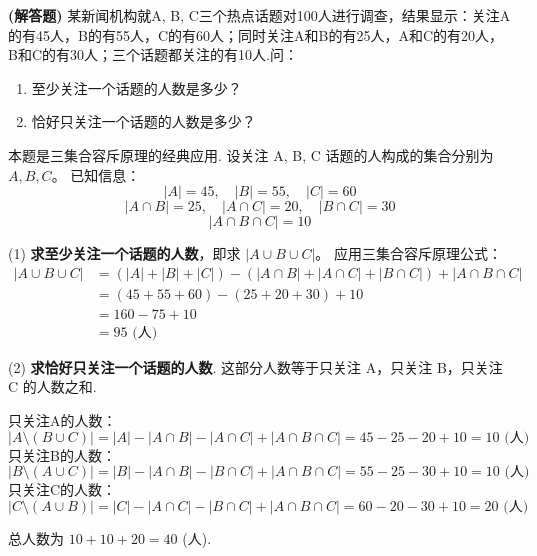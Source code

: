 \begin{prob}[topic={三集合容斥原理}, score=12]
\textbf{(解答题)} 某新闻机构就A, B, C三个热点话题对100人进行调查，结果显示：关注A的有45人，B的有55人，C的有60人；同时关注A和B的有25人，A和C的有20人，B和C的有30人；三个话题都关注的有10人.问：
\begin{enumerate}
	\item 至少关注一个话题的人数是多少？
	\item 恰好只关注一个话题的人数是多少？
\end{enumerate}
\end{prob}
\begin{prob-sol}
本题是三集合容斥原理的经典应用.
设关注 A, B, C 话题的人构成的集合分别为 $A, B, C$。
已知信息：
\[ \lvert A\rvert=45, \quad \lvert B\rvert=55, \quad \lvert C\rvert=60 \]
\[ \lvert A \cap B\rvert=25, \quad \lvert A \cap C\rvert=20, \quad \lvert B \cap C\rvert=30 \]
\[ \lvert A \cap B \cap C\rvert=10 \]

(1) \textbf{求至少关注一个话题的人数}，即求 $\lvert A \cup B \cup C\rvert$。
应用三集合容斥原理公式：
\begin{align*}
	\lvert A \cup B \cup C\rvert &= (\lvert A\rvert+\lvert B\rvert+\lvert C\rvert) - (\lvert A \cap B\rvert+\lvert A \cap C\rvert+\lvert B \cap C\rvert) + \lvert A \cap B \cap C\rvert \\
	&= (45+55+60) - (25+20+30) + 10 \\
	&= 160 - 75 + 10 \\
	&= 95 \text{ (人)}
\end{align*}

(2) \textbf{求恰好只关注一个话题的人数}.
这部分人数等于只关注 A，只关注 B，只关注 C 的人数之和.

只关注A的人数：
\[ \lvert A \setminus (B \cup C)\rvert = \lvert A\rvert - \lvert A \cap B\rvert - \lvert A \cap C\rvert + \lvert A \cap B \cap C\rvert = 45 - 25 - 20 + 10 = 10 \text{ (人)} \]
只关注B的人数：
\[ \lvert B \setminus (A \cup C)\rvert = \lvert B\rvert - \lvert A \cap B\rvert - \lvert B \cap C\rvert + \lvert A \cap B \cap C\rvert = 55 - 25 - 30 + 10 = 10 \text{ (人)} \]
只关注C的人数：
\[ \lvert C \setminus (A \cup B)\rvert = \lvert C\rvert - \lvert A \cap C\rvert - \lvert B \cap C\rvert + \lvert A \cap B \cap C\rvert = 60 - 20 - 30 + 10 = 20 \text{ (人)} \]

总人数为 $10 + 10 + 20 = 40$ (人).
\end{prob-sol}
